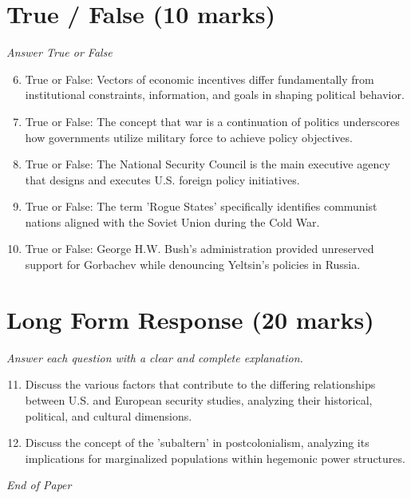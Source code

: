 \documentclass[12pt]{article}
\begin{document}
\section*{True / False (10 marks)}
\textit{Answer True or False}
\begin{enumerate}[label=\arabic*.]
\setcounter{enumi}{5}
\item True or False: Vectors of economic incentives differ fundamentally from institutional constraints, information, and goals in shaping political behavior.
\item True or False: The concept that war is a continuation of politics underscores how governments utilize military force to achieve policy objectives.
\item True or False: The National Security Council is the main executive agency that designs and executes U.S. foreign policy initiatives.
\item True or False: The term 'Rogue States' specifically identifies communist nations aligned with the Soviet Union during the Cold War.
\item True or False: George H.W. Bush's administration provided unreserved support for Gorbachev while denouncing Yeltsin's policies in Russia.
\end{enumerate}

\section*{Long Form Response (20 marks)}
\textit{Answer each question with a clear and complete explanation.}
\begin{enumerate}[label=\arabic*.]
\setcounter{enumi}{10}
\item Discuss the various factors that contribute to the differing relationships between U.S. and European security studies, analyzing their historical, political, and cultural dimensions.
\item Discuss the concept of the 'subaltern' in postcolonialism, analyzing its implications for marginalized populations within hegemonic power structures.
\end{enumerate}

\vfill
\noindent\textit{End of Paper}
\end{document}
